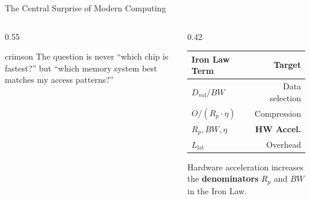 \documentclass[aspectratio=169, 12pt]{beamer}
\begin{document}
\begin{frame}{The Central Surprise of Modern Computing}
\begin{columns}[T]
\begin{column}{0.55\textwidth}
    \vspace{0.1cm}
    \begin{mlsyscard}{crimson}
    {\footnotesize The question is never ``which chip is fastest?'' but \alert{``which memory system best matches my access patterns?''}}
    \end{mlsyscard}
  \end{column}
  \begin{column}{0.42\textwidth}
    {\scriptsize
    \renewcommand{\arraystretch}{1.1}
    \begin{tabular}{@{}lr@{}}
      \toprule
      \textbf{Iron Law Term} & \textbf{Target} \\
      \midrule
      $D_{\text{vol}}/BW$    & Data selection \\
      $O/(R_p \cdot \eta)$   & Compression \\
      $R_p, BW, \eta$        & \textcolor{computestroke}{\textbf{HW Accel.}} \\
      $L_{\text{lat}}$       & Overhead \\
      \bottomrule
    \end{tabular}
    }

    \vspace{0.1cm}
    {\scriptsize Hardware acceleration increases the \textbf{denominators} $R_p$ and $BW$ in the Iron Law.}
  \end{column}
\end{columns}

\end{frame}
\end{document}
